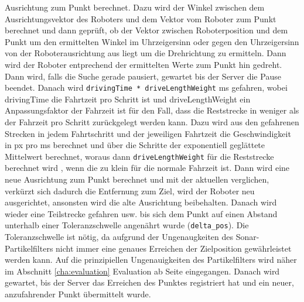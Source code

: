 Ausrichtung zum Punkt berechnet. Dazu wird der Winkel zwischen dem
Ausrichtungsvektor des Roboters und dem Vektor vom Roboter zum Punkt berechnet und dann geprüft,
ob der Vektor zwischen Roboterposition und dem Punkt um den ermittelten
Winkel im Uhrzeigersinn oder gegen den Uhrzeigersinn von der
Roboterausrichtung aus liegt um die Drehrichtung zu ermitteln. Dann wird
der Roboter entprechend der ermittelten Werte zum Punkt hin gedreht.
Dann wird, falls die Suche gerade pausiert, gewartet bis der Server die
Pause beendet. Danach wird 
\lstinline|drivingTime * driveLengthWeight| ms gefahren, wobei drivingTime die
Fahrtzeit pro Schritt ist und driveLengthWeight ein Anpassungsfaktor der
Fahrzeit ist für den Fall, dass die Reststrecke in weniger als der
Fahrzeit pro Schritt zurückgelegt werden kann. Dazu wird aus den gefahrenen Strecken in jedem
Fahrtschritt und der jeweiligen Fahrtzeit die Geschwindigkeit in px pro ms
berechnet und über die Schritte der exponentiell geglättete Mittelwert
berechnet, woraus dann \lstinline|driveLengthWeight| für die Reststrecke berechnet wird
, wenn die zu klein für die normale Fahrzeit ist. 
Dann wird eine neue Ausrichtung zum Punkt berechnet und mit der aktuellen
 verglichen, verkürzt sich dadurch die Entfernung zum Ziel, wird der
Roboter neu ausgerichtet, ansonsten wird die alte Ausrichtung beibehalten.
Danach wird wieder eine Teilstrecke gefahren usw. bis sich dem Punkt auf
einen Abstand unterhalb einer Toleranzschwelle angenährt wurde
(\lstinline|delta_pos|). 
Die Toleranzschwelle ist nötig, da aufgrund der Ungenaugkeiten des
Sonar-Partikelfilters nicht immer eine genaues Erreichen der
Zielposition gewährleistet werden kann.  Auf die prinzipiellen
Ungenauigkeiten des Partikelfilters wird näher im Abschnitt
\ref{cha:evaluation} Evaluation
ab Seite \pageref{cha:evaluation} eingegangen. 
Danach wird gewartet, bis der Server das Erreichen des Punktes registriert
hat und ein neuer, anzufahrender Punkt übermittelt wurde.






